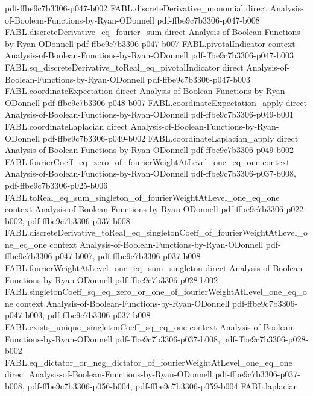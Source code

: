 \begin{theorem}
  {pdf-ffbe9c7b3306-p047-b002}
\proofstep
  {FABL.discreteDerivative_monomial}
  {direct}
  {Analysis-of-Boolean-Functions-by-Ryan-ODonnell}
  {pdf-ffbe9c7b3306-p047-b008}
\proofstep
  {FABL.discreteDerivative_eq_fourier_sum}
  {direct}
  {Analysis-of-Boolean-Functions-by-Ryan-ODonnell}
  {pdf-ffbe9c7b3306-p047-b007}
\proofstep
  {FABL.pivotalIndicator}
  {context}
  {Analysis-of-Boolean-Functions-by-Ryan-ODonnell}
  {pdf-ffbe9c7b3306-p047-b003}
\proofstep
  {FABL.sq_discreteDerivative_toReal_eq_pivotalIndicator}
  {direct}
  {Analysis-of-Boolean-Functions-by-Ryan-ODonnell}
  {pdf-ffbe9c7b3306-p047-b003}
\proofstep
  {FABL.coordinateExpectation}
  {direct}
  {Analysis-of-Boolean-Functions-by-Ryan-ODonnell}
  {pdf-ffbe9c7b3306-p048-b007}
\proofstep
  {FABL.coordinateExpectation_apply}
  {direct}
  {Analysis-of-Boolean-Functions-by-Ryan-ODonnell}
  {pdf-ffbe9c7b3306-p049-b001}
\proofstep
  {FABL.coordinateLaplacian}
  {direct}
  {Analysis-of-Boolean-Functions-by-Ryan-ODonnell}
  {pdf-ffbe9c7b3306-p049-b002}
\proofstep
  {FABL.coordinateLaplacian_apply}
  {direct}
  {Analysis-of-Boolean-Functions-by-Ryan-ODonnell}
  {pdf-ffbe9c7b3306-p049-b002}
\proofstep
  {FABL.fourierCoeff_eq_zero_of_fourierWeightAtLevel_one_eq_one}
  {context}
  {Analysis-of-Boolean-Functions-by-Ryan-ODonnell}
  {pdf-ffbe9c7b3306-p037-b008,
    pdf-ffbe9c7b3306-p025-b006}
\proofstep
  {FABL.toReal_eq_sum_singleton_of_fourierWeightAtLevel_one_eq_one}
  {context}
  {Analysis-of-Boolean-Functions-by-Ryan-ODonnell}
  {pdf-ffbe9c7b3306-p022-b002,
    pdf-ffbe9c7b3306-p037-b008}
\proofstep
  {FABL.discreteDerivative_toReal_eq_singletonCoeff_of_fourierWeightAtLevel_one_eq_one}
  {context}
  {Analysis-of-Boolean-Functions-by-Ryan-ODonnell}
  {pdf-ffbe9c7b3306-p047-b007,
    pdf-ffbe9c7b3306-p037-b008}
\proofstep
  {FABL.fourierWeightAtLevel_one_eq_sum_singleton}
  {direct}
  {Analysis-of-Boolean-Functions-by-Ryan-ODonnell}
  {pdf-ffbe9c7b3306-p028-b002}
\proofstep
  {FABL.singletonCoeff_sq_eq_zero_or_one_of_fourierWeightAtLevel_one_eq_one}
  {context}
  {Analysis-of-Boolean-Functions-by-Ryan-ODonnell}
  {pdf-ffbe9c7b3306-p047-b003,
    pdf-ffbe9c7b3306-p037-b008}
\proofstep
  {FABL.exists_unique_singletonCoeff_sq_eq_one}
  {context}
  {Analysis-of-Boolean-Functions-by-Ryan-ODonnell}
  {pdf-ffbe9c7b3306-p037-b008,
    pdf-ffbe9c7b3306-p028-b002}
\proofstep
  {FABL.eq_dictator_or_neg_dictator_of_fourierWeightAtLevel_one_eq_one}
  {direct}
  {Analysis-of-Boolean-Functions-by-Ryan-ODonnell}
  {pdf-ffbe9c7b3306-p037-b008,
    pdf-ffbe9c7b3306-p056-b004,
    pdf-ffbe9c7b3306-p059-b004}
\proofstep
  {FABL.laplacian}

\end{theorem}
